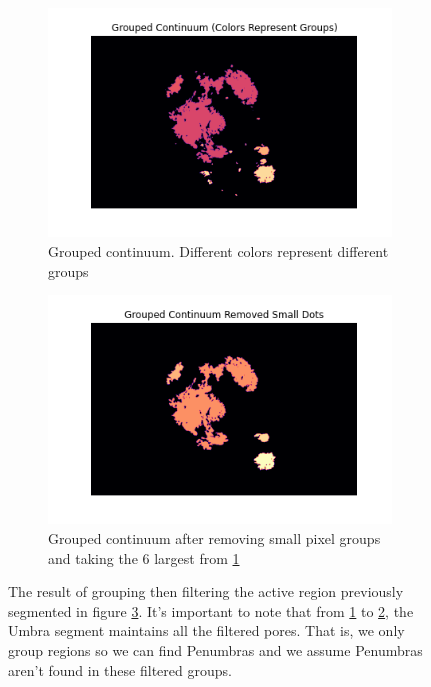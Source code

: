 \begin{enumerate}
    
\begin{figure}[h]
\centering
\begin{subfigure}[b]{.45\textwidth}
  \centering
  \includegraphics[width=.8\linewidth]{ThesisFilePkg/figures/data/segments_grouped.png}
  \caption{Grouped continuum. Different colors represent different groups}
  \label{fig:grouped}
\end{subfigure}%
\quad
\begin{subfigure}[b]{.45\textwidth}
  \centering
  \includegraphics[width=.8\linewidth]{ThesisFilePkg/figures/data/segments_grouped_filtered.png}
  \caption{Grouped continuum after removing small pixel groups and taking the 6 largest from \ref{fig:grouped}}
  \label{fig:groupedfiltered}
\end{subfigure}
\caption{The result of grouping then filtering the active region previously segmented in figure \ref{fig:binarythresh}. It's important to note that from \ref{fig:grouped} to \ref{fig:groupedfiltered}, the Umbra segment maintains all the filtered pores. That is, we only group regions so we can find Penumbras and we assume Penumbras aren't found in these filtered groups.}
\label{fig:binarythresh}
\end{figure}
    

\end{enumerate}
